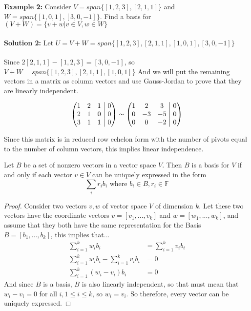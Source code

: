 \documentclass[12pt]{article}
\makeatletter
\newenvironment{amatrix}[1]{%
  \left(\begin{array}{@{}*{#1}{c}|c@{}}
}{%
  \end{array}\right)
}
\makeatother
\begin{document}
\textbf{Example 2:} Consider $V = span\{[1,2,3],[2,1,1] \}$ and $W = span\{[1,0,1],[3,0,-1]\}$. Find a basis for $(V + W) = \{ v + w | v\in V, w \in W\}$
\\
\\
\textbf{Solution 2:} Let $U = V + W = span\{[1,2,3],[2,1,1],[1,0,1],[3,0,-1] \}$\\
\\
Since $2[2,1,1] - [1,2,3] = [3,0,-1]$, so $V + W = span\{[1,2,3],[2,1,1],[1,0,1]\}$ And we will put the remaining vectors in a matrix as column vectors and use Gauss-Jordan to prove that they are linearly independent.

$$\begin{amatrix}{3}
1 & 2 & 1 & 0 \\
2 & 1 & 0 & 0 \\
3 & 1 & 1 & 0
\end{amatrix} \thicksim
\begin{amatrix}{3}
1 & 2 & 3 & 0 \\
0 & -3 & -5 & 0 \\
0 & 0 & -2 & 0
\end{amatrix}$$

Since this matrix is in reduced row echelon form with the number of pivots equal to the number of column vectors, this implies linear independence.

\begin{tcolorbox}[title=Unique Combination Criterion for a Basis]
	Let $B$ be a set of nonzero vectors in a vector space $V$. Then $B$ is a basis for $V$ if and only if each vector $v \in V$ can be uniquely expressed in the form
	$$\sum_i r_i b_i \text{ where } b_i \in B, r_i \in \mathbb{F}$$
\end{tcolorbox}

\begin{proof}
	Consider two vectors $v,w$ of vector space $V$ of dimension $k$. Let these two vectors have the coordinate vectors $v=[v_1, ..., v_k]$ and $w=[w_1, ..., w_k]$, and assume that they both have the same representation for the Basis $B=[b_1, ..., b_k]$, this implies that...
	\begin{align*}
		\sum_{i=1}^k w_ib_i &= \sum_{i=1}^k v_ib_i\\
		\sum_{i=1}^k w_ib_i - \sum_{i=1}^k v_ib_i &= 0\\
		\sum_{i=1}^k (w_i - v_i)b_i&= 0
	\end{align*}
And since $B$ is a basis, $B$ is also linearly independent, so that must mean that $w_i - v_i = 0$ for all $i, 1 \leq i \leq k$, so $w_i = v_i$. So therefore, every vector can be uniquely expressed. 
	
\end{proof}
\end{document}
